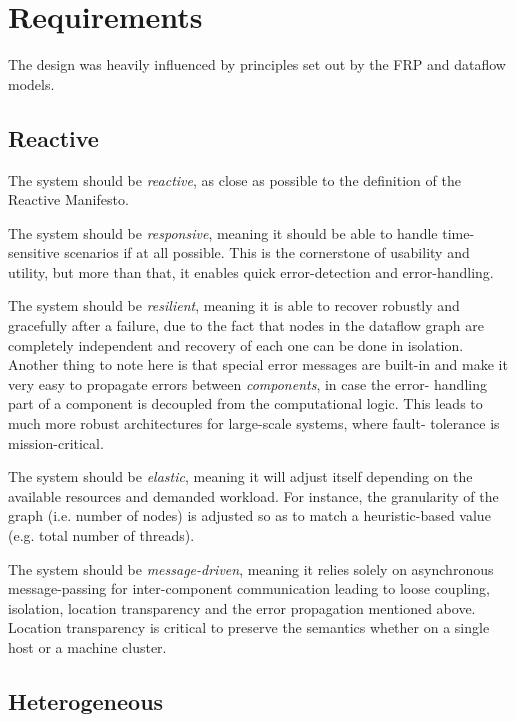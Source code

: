 \documentclass[sigplan,review,anonymous]{acmart}
\begin{document}

\section{Requirements} \label{sec:requirements}

The design was heavily influenced by principles set out by the FRP and dataflow
models.

\subsection{Reactive}

The system should be \textit{reactive}, as close as possible to the definition
of the Reactive Manifesto\cite{manifesto}.

The system should be \textit{responsive}, meaning it should be able to handle
time-sensitive scenarios if at all possible. This is the cornerstone of
usability and utility, but more than that, it enables quick error-detection and
error-handling.

The system should be \textit{resilient}, meaning it is able to recover robustly
and gracefully after a failure, due to the fact that nodes in the dataflow graph
are completely independent and recovery of each one can be done in isolation.
Another thing to note here is that special error messages are built-in and make
it very easy to propagate errors between \textit{components}, in case the error-
handling part of a component is decoupled from the computational logic. This
leads to much more robust architectures for large-scale systems, where fault-
tolerance is mission-critical.

The system should be \textit{elastic}, meaning it will adjust itself depending
on the available resources and demanded workload. For instance, the granularity
of the graph (i.e. number of nodes) is adjusted so as to match a heuristic-based
value (e.g. total number of threads).

The system should be \textit{message-driven}, meaning it relies solely on
asynchronous message-passing for inter-component communication leading to loose
coupling, isolation, location transparency and the error propagation mentioned
above. Location transparency is critical to preserve the semantics whether on a
single host or a machine cluster.

\subsection{Heterogeneous}
\end{document}
